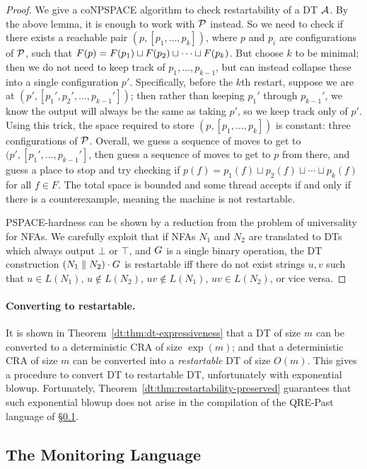 \begin{proof}
We give a coNPSPACE algorithm to check restartability of a DT $\mathcal{A}$. By the above lemma, it is enough to work with $\mathcal{P}$ instead.
So we need to check if there exists
a reachable pair $(p, [p_1,\ldots,p_k])$,
where $p$ and $p_i$ are configurations of $\mathcal{P}$,
such that
$F(p) = F(p_1) \sqcup F(p_2) \sqcup \cdots \sqcup F(p_k)$.
But choose $k$ to be minimal;
then we do not need to keep track of $p_1, \ldots, p_{k-1}$,
but can instead collapse these into a single configuration $p'$.
Specifically, before the $k$th restart,
suppose we are at $(p', [p_1',p_2',\ldots, p_{k-1}'])$;
then rather than keeping $p_1'$ through $p_{k-1}'$,
we know the output will always be the same as taking $p'$,
so we keep track only of $p'$.
Using this trick, the space required to store
$(p, [p_1, \ldots, p_k])$ is constant: three configurations of $\mathcal{P}$.
Overall, we guess a sequence of moves to get
to $(p', [p_1', \ldots, p_{k-1}']$,
then guess a sequence of moves to get to $p$ from there,
and guess a place to stop and try checking if
$p(f) = p_1(f) \sqcup p_2(f) \sqcup \cdots \sqcup p_k(f)$ for all $f \in F$.
The total space is bounded and some thread accepts if and only if there is a counterexample,
meaning the machine is not restartable.

PSPACE-hardness can be shown by a reduction from the problem of universality for NFAs.
We carefully exploit that if
NFAs $N_1$ and $N_2$ are translated to DTs which always output $\bot$ or $\top$,
and $G$ is a single binary operation,
the DT construction $(N_1 \; \| \; N_2) \cdot G$ is restartable iff
there do not exist strings $u, v$ such that
$u \in L(N_1)$, $u \notin L(N_2)$, $uv \notin L(N_1)$, $uv \in L(N_2)$, or vice versa.
\end{proof}

\paragraph*{Converting to restartable.}
It is shown in Theorem~\ref{dt:thm:dt-expressiveness} that a DT of size $m$ can be converted to a deterministic CRA of size $\exp(m)$; and that a deterministic CRA of size $m$ can be converted into a \emph{restartable} DT of size $O(m)$. This gives a procedure to convert DT to restartable DT, unfortunately with exponential blowup. Fortunately, Theorem~\ref{dt:thm:restartability-preserved} guarantees that such exponential blowup does not arise in the compilation of the QRE-Past language of \S\ref{dt:sec:rm}.

\subsection{The \QREpast{} Monitoring Language}
\label{dt:sec:rm}

